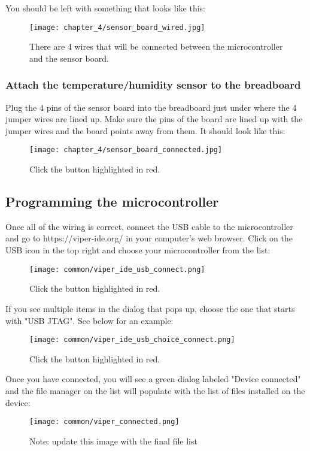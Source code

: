You should be left with something that looks like this:
\begin{figure}[H]
    \centering
    \texttt{[image: chapter\_4/sensor\_board\_wired.jpg]}
    \caption{There are 4 wires that will be connected between the microcontroller and the sensor board.}
\end{figure}

\subsubsection{Attach the temperature/humidity sensor to the breadboard}
Plug the 4 pins of the sensor board into the breadboard just under where the 4 jumper wires are lined up. Make sure the pins
of the board are lined up with the jumper wires and the board points away from them. It should look like this:

\begin{figure}[H]
    \centering
    \texttt{[image: chapter\_4/sensor\_board\_connected.jpg]}
    \caption{Click the button highlighted in red.}
\end{figure}

\subsection{Programming the microcontroller}
Once all of the wiring is correct, connect the USB cable to the microcontroller and go to https://viper-ide.org/ in your
computer's web browser. Click on the USB icon in the top right and choose your microcontroller from the list:

\begin{figure}[H]
    \centering
    \texttt{[image: common/viper\_ide\_usb\_connect.png]}
    \caption{Click the button highlighted in red.}
\end{figure}

If you see multiple items in the dialog that pops up, choose the one that starts with "USB JTAG". See below for an example:
\begin{figure}[H]
    \centering
    \texttt{[image: common/viper\_ide\_usb\_choice\_connect.png]}
    \caption{Click the button highlighted in red.}
\end{figure}

Once you have connected, you will see a green dialog labeled "Device connected" and the file manager on the list
will populate with the list of files installed on the device:
\begin{figure}[H]
    \centering
    \texttt{[image: common/viper\_connected.png]}
    \caption{Note: update this image with the final file list}
\end{figure}

